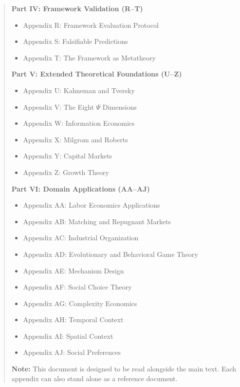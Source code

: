 \documentclass[12pt,a4paper]{article}
\begin{document}
\begin{abstract}
\textbf{Part IV: Framework Validation (R--T)}
\begin{itemize}[noitemsep]
    \item Appendix R: Framework Evaluation Protocol
    \item Appendix S: Falsifiable Predictions
    \item Appendix T: The Framework as Metatheory
\end{itemize}

\textbf{Part V: Extended Theoretical Foundations (U--Z)}
\begin{itemize}[noitemsep]
    \item Appendix U: Kahneman and Tversky
    \item Appendix V: The Eight $\Psi$ Dimensions
    \item Appendix W: Information Economics
    \item Appendix X: Milgrom and Roberts
    \item Appendix Y: Capital Markets
    \item Appendix Z: Growth Theory
\end{itemize}

\textbf{Part VI: Domain Applications (AA--AJ)}
\begin{itemize}[noitemsep]
    \item Appendix AA: Labor Economics Applications
    \item Appendix AB: Matching and Repugnant Markets
    \item Appendix AC: Industrial Organization
    \item Appendix AD: Evolutionary and Behavioral Game Theory
    \item Appendix AE: Mechanism Design
    \item Appendix AF: Social Choice Theory
    \item Appendix AG: Complexity Economics
    \item Appendix AH: Temporal Context
    \item Appendix AI: Spatial Context
    \item Appendix AJ: Social Preferences
\end{itemize}

\vspace{0.5em}
\noindent\textbf{Note:} This document is designed to be read alongside the main text. Each appendix can also stand alone as a reference document.
\end{abstract}

\tableofcontents
\newpage
\end{document}
